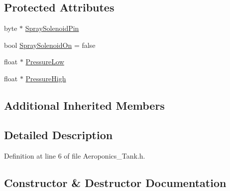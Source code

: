 \subsection*{Protected Attributes}
\begin{DoxyCompactItemize}
\item 
byte $\ast$ \hyperlink{class_aeroponics___tank_ac4756204f5ddb062dcb726cf791baa09}{Spray\+Solenoid\+Pin}
\item 
bool \hyperlink{class_aeroponics___tank_acf900db5eed539b3aa229afe4f2058b9}{Spray\+Solenoid\+On} = false
\item 
float $\ast$ \hyperlink{class_aeroponics___tank_aa0d7f59821df87a90452df405afb79c6}{Pressure\+Low}
\item 
float $\ast$ \hyperlink{class_aeroponics___tank_ad5b7275a6f3b5f15041821fadb4e3a95}{Pressure\+High}
\end{DoxyCompactItemize}
\subsection*{Additional Inherited Members}


\subsection{Detailed Description}


Definition at line 6 of file Aeroponics\+\_\+\+Tank.\+h.



\subsection{Constructor \& Destructor Documentation}
\mbox{\label{class_aeroponics___tank_aab07821dc597c986608a886093e14ff7}} 
